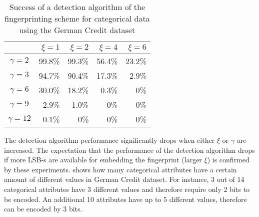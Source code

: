 \begin{table}[ht]
    \centering
    \caption{Success of a detection algorithm of the fingerprinting scheme for categorical data using the German Credit dataset}
    \label{tab:detection-succ-german}
    \begin{tabular}{|c|r|r|r|r|}
    \hline
         & $\xi=1$ & $\xi=2$ & $\xi=4$ & $\xi=6$ \\
         \hline
         $\gamma=2$ & 99.8\% & 99.3\% & 56.4\% & 23.2\%\\
         \hline
         $\gamma=3$ & 94.7\% & 90.4\% & 17.3\% & 2.9\% \\
         \hline
         $\gamma=6$ & 30.0\% & 18.2\% & 0.3\% & 0\%\\
         \hline
         $\gamma=9$ &  2.9\% & 1.0\% & 0\% & 0\%\\
         \hline
         $\gamma=12$ & 0.1\% & 0\% & 0\% & 0\%\\
         \hline
    \end{tabular}
\end{table}

The detection algorithm performance significantly drops when either $\xi$ or $\gamma$ are increased. 
The expectation that the performance of the detection algorithm drops if more LSB-s are available for embedding the fingerprint (larger $\xi$) is confirmed by these experiments. 
 shows how many categorical attributes have a certain amount of different values in German Credit dataset. 
For instance, 3 out of 14 categorical attributes have 3 different values and therefore require only 2 bits to be encoded. 
An additional 10 attributes have up to 5 different values, therefore can be encoded by 3 bits. 


